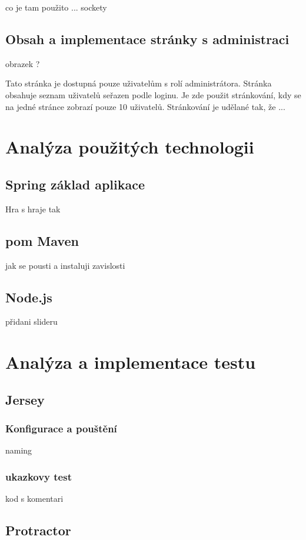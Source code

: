 \documentclass[czech,master,public,dept460,male,cpdeclaration,twoside]{diploma}
\begin{document}
co je tam použito ... sockety

\subsection{Obsah a implementace stránky s administraci}
obrazek ?

Tato stránka je dostupná pouze uživatelům s rolí administrátora. Stránka obsahuje seznam uživatelů seřazen podle loginu. Je zde použit stránkování, kdy se na jedné stránce zobrazí pouze 10 uživatelů.
Stránkování je udělané tak, že ...

\section{Analýza použitých technologii}
\subsection{Spring základ aplikace}
Hra s hraje tak
 
\subsection{pom Maven}
jak se pousti a instaluji zavislosti

\subsection{Node.js}
přidani slideru

\section{Analýza a implementace testu}

\subsection{Jersey}
\subsubsection{Konfigurace a pouštění}
naming 

\subsubsection{ukazkovy test}
kod s komentari


\subsection{Protractor}
\end{document}
